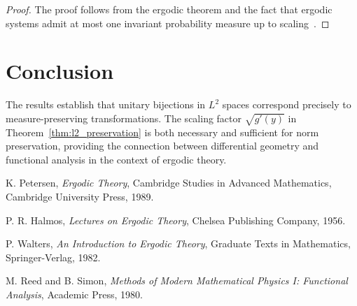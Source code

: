 \documentclass[11pt]{article}
\theoremstyle{theorem}
\theoremstyle{definition}
\begin{document}
\begin{proof}
The proof follows from the ergodic theorem and the fact that ergodic systems admit at most one invariant probability measure up to scaling~\cite{petersen1989ergodic}.
\end{proof}

\section{Conclusion}

The results establish that unitary bijections in $L^2$ spaces correspond precisely to measure-preserving transformations. The scaling factor $\sqrt{g'(y)}$ in Theorem~\ref{thm:l2_preservation} is both necessary and sufficient for norm preservation, providing the connection between differential geometry and functional analysis in the context of ergodic theory.

\begin{thebibliography}{9}

K. Petersen, \emph{Ergodic Theory}, Cambridge Studies in Advanced Mathematics, Cambridge University Press, 1989.

P. R. Halmos, \emph{Lectures on Ergodic Theory}, Chelsea Publishing Company, 1956.

P. Walters, \emph{An Introduction to Ergodic Theory}, Graduate Texts in Mathematics, Springer-Verlag, 1982.

M. Reed and B. Simon, \emph{Methods of Modern Mathematical Physics I: Functional Analysis}, Academic Press, 1980.

\end{thebibliography}
\end{document}
